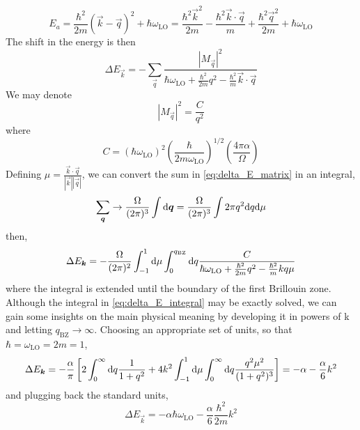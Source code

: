 \begin{equation}
    E_a = \frac{\hbar^2}{2m}(\vec{k}-\vec{q})^2 + \hbar\omega_\text{LO}
    = \frac{\hbar^2\vec{k}^2}{2m} - \frac{\hbar^2\vec{k}\cdot\vec{q}}{m} + \frac{\hbar^2\vec{q}^2}{2m} + \hbar\omega_\text{LO}
\end{equation}
The shift in the energy is then
\begin{equation} \label{eq:delta_E_matrix}
    \Delta E_\vec{k} = -\sum_\vec{q} \frac{|M_\vec{q}|^2}{\hbar\omega_\text{LO} + \frac{\hbar^2}{2m}q^2 - \frac{\hbar^2}{m}\vec{k}\cdot\vec{q}}
\end{equation}
We may denote
\begin{equation} \label{eq:interaction_matrix_simplified}
    |M_\vec{q}|^2 = \frac{C}{q^2}
\end{equation}
where
\begin{equation} \label{eq:C}
    C = (\hbar \omega_\text{LO})^2 \left(\frac{\hbar}{2m\omega_\text{LO}}\right)^{1/2} \left(\frac{4\pi\alpha}{\Omega}\right)
\end{equation}
Defining $\mu = \frac{\vec{k}\cdot\vec{q}}{|\vec{k}||\vec{q}|}$, we can convert the sum in \cref{eq:delta_E_matrix} in an integral,
\begin{equation}
    \sum_\vec{q} \rightarrow \frac{\Omega}{(2\pi)^3} \int \differential\vec{q} = \frac{\Omega}{(2\pi)^3} \int 2\pi q^2 \differential q \differential \mu
\end{equation}
then,
\begin{equation}\label{eq:delta_E_integral}
    \Delta E_\vec{k} = - \frac{\Omega}{(2\pi)^2} \int_{-1}^1 \differential \mu \int_0^{q_\text{BZ}} \differential q \frac{C}{\hbar\omega_\text{LO} + \frac{\hbar^2}{2m}q^2 - \frac{\hbar^2}{m} kq\mu}
\end{equation}
where the integral is extended until the boundary of the first Brillouin zone. Although the integral in \cref{eq:delta_E_integral} may be exactly solved, we can gain some insights on the main physical meaning by developing it in powers of k and letting $q_\text{BZ} \rightarrow \infty$. Choosing an appropriate set of units, so that $\hbar  = \omega_\text{LO} = 2m = 1$,
\begin{equation}
    \Delta E_\vec{k} = - \frac{\alpha}{\pi} \left[
        2\int_0^\infty \differential q \frac{1}{1+q^2}
        + 4k^2 \int_{-1}^1 \differential \mu \int_0^\infty \differential q \frac{q^2\mu^2}{(1+q^2)^3} \right]
    = - \alpha - \frac{\alpha}{6}k^2
\end{equation}
and plugging back the standard units,
\begin{equation}
    \Delta E_\vec{k} = -\alpha \hbar \omega_\text{LO} - \frac{\alpha}{6}\frac{\hbar^2}{2m}k^2
\end{equation}
